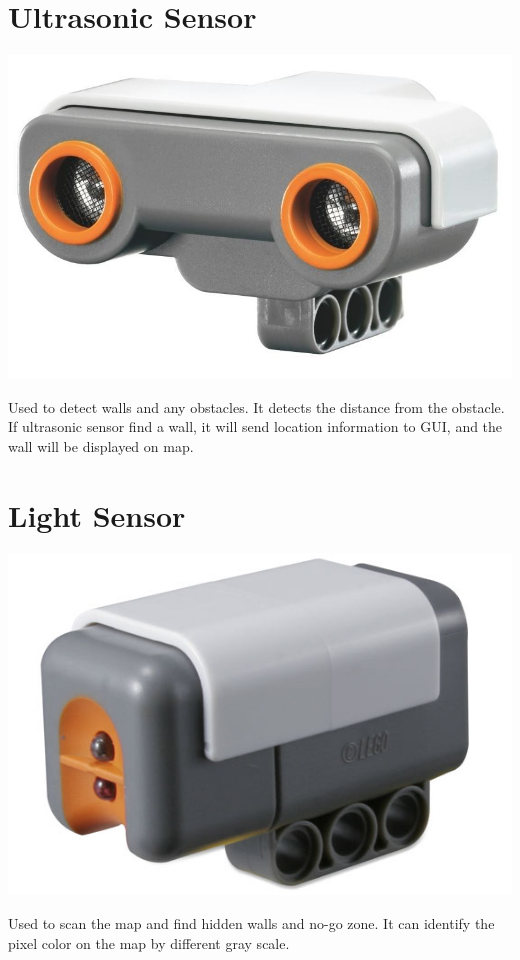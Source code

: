 \documentclass[11pt, a4paper]{report}
\begin{document}
\section{Ultrasonic Sensor}

\begin{center}
\includegraphics[scale=0.2]{./image/Ultrasonic.jpg}\\[0.5cm]
\end{center}
Used to detect walls and any obstacles. It detects the distance from the obstacle. If ultrasonic sensor find a wall, it will send location information to GUI, and the wall will be displayed on map. 

\section{Light Sensor}

\begin{center}
\includegraphics[scale=0.3]{./image/Light.jpg}\\[0.5cm]
\end{center}
Used to scan the map and find hidden walls and no-go zone. It can identify the pixel color on the map by different gray scale.
\end{document}
